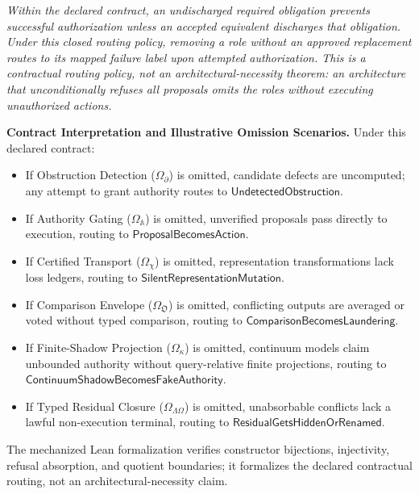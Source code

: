 \documentclass[
  10pt,
]{article}
\begin{document}
\emph{Within the declared contract, an undischarged required obligation prevents successful authorization unless an accepted equivalent discharges that obligation. Under this closed routing policy, removing a role without an approved replacement routes to its mapped failure label upon attempted authorization. This is a contractual routing policy, not an architectural-necessity theorem: an architecture that unconditionally refuses all proposals omits the roles without executing unauthorized actions.}

\textbf{Contract Interpretation and Illustrative Omission Scenarios.} Under this declared contract:

\begin{itemize}
\item
  If Obstruction Detection (\hypertarget{math-E0022-0164}{}{\(\Omega_{\partial}\)}) is omitted, candidate defects are uncomputed; any attempt to grant authority routes to \hypertarget{math-E0121-0165}{}{\(\mathsf{UndetectedObstruction}\)}.
\item
  If Authority Gating (\hypertarget{math-E0023-0166}{}{\(\Omega_{\mathbb{A}}\)}) is omitted, unverified proposals pass directly to execution, routing to \hypertarget{math-E0122-0167}{}{\(\mathsf{ProposalBecomesAction}\)}.
\item
  If Certified Transport (\hypertarget{math-E0025-0168}{}{\(\Omega_{\chi}\)}) is omitted, representation transformations lack loss ledgers, routing to \hypertarget{math-E0123-0169}{}{\(\mathsf{SilentRepresentationMutation}\)}.
\item
  If Comparison Envelope (\hypertarget{math-E0026-0170}{}{\(\Omega_{\mathfrak{O}}\)}) is omitted, conflicting outputs are averaged or voted without typed comparison, routing to \hypertarget{math-E0124-0171}{}{\(\mathsf{ComparisonBecomesLaundering}\)}.
\item
  If Finite-Shadow Projection (\hypertarget{math-E0027-0172}{}{\(\Omega_{\kappa}\)}) is omitted, continuum models claim unbounded authority without query-relative finite projections, routing to \hypertarget{math-E0125-0173}{}{\(\mathsf{ContinuumShadowBecomesFakeAuthority}\)}.
\item
  If Typed Residual Closure (\hypertarget{math-E0028-0174}{}{\(\Omega_{\Lambda\Omega}\)}) is omitted, unabsorbable conflicts lack a lawful non-execution terminal, routing to \hypertarget{math-E0059-0175}{}{\(\mathsf{ResidualGetsHiddenOrRenamed}\)}.
\end{itemize}

The mechanized Lean formalization verifies constructor bijections, injectivity, refusal absorption, and quotient boundaries; it formalizes the declared contractual routing, not an architectural-necessity claim.
\end{document}
